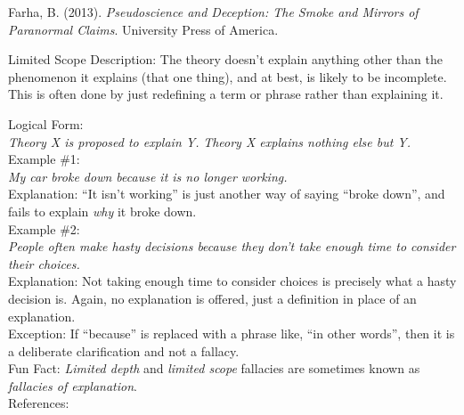 \documentclass[a4paper,12pt,single,pdftex]{scrbook}
\begin{document}
      
        
          Farha, B. (2013). {\it Pseudoscience and Deception: The Smoke and Mirrors of Paranormal Claims}. University Press of America.
        
      
    
  

Limited Scope
    Description: The theory doesn't explain anything other than the phenomenon it explains (that one thing), and at best, is likely to be incomplete.  This is often done by just redefining a term or phrase rather than explaining it.

    
      Logical Form:
    \\

    
      {\em Theory X is proposed to explain Y.} \newline
{\em Theory X explains nothing else but Y.}
    \\

    
      Example \#1:
    \\

    
      {\em My car broke down because it is no longer working.}
    \\

    
      Explanation: “It isn’t working” is just another way of saying “broke down”, and fails to explain {\it why} it broke down.
    \\

    
      Example \#2:
    \\

    
      {\em People often make hasty decisions because they don’t take enough time to consider their choices.}
    \\

    
      Explanation: Not taking enough time to consider choices is precisely what a hasty decision is.  Again, no explanation is offered, just a definition in place of an explanation.
    \\

    
      Exception: If “because” is replaced with a phrase like, “in other words”, then it is a deliberate clarification and not a fallacy.
    \\

    
      Fun Fact: {\em {\it Limited depth}} and {\em limited scope}  fallacies are sometimes known as {\em fallacies of explanation}.
    \\

    References:

    
      
\end{document}
